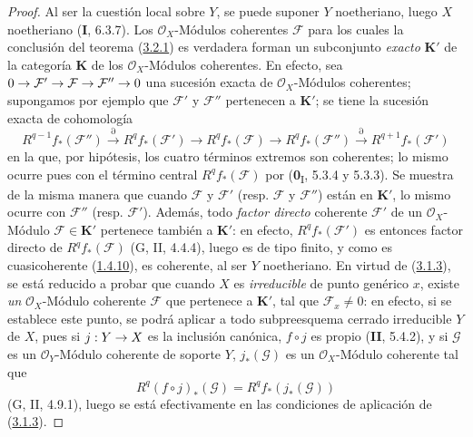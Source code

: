 \documentclass[10pt,oneside,openany]{book}
\theoremstyle{egaenv}\newtheorem*{env}{---}
\theoremstyle{egastatement}
\theoremstyle{egadescription}
\newcommand{\oldpage}[2][]{\marginnote{\normalfont\scriptsize\textbf{#1}\,|\,#2}\ignorespaces}
\renewcommand{\to}{\mathchoice{\longrightarrow}{\rightarrow}{\rightarrow}{\rightarrow}}
\begin{document}
\begin{proof}
Al ser la cuestión local sobre $Y$, se puede suponer $Y$ noetheriano, luego $X$
noetheriano (\textbf{I}, 6.3.7). Los $\mathcal O_X$-Módulos coherentes $\mathcal F$ para
los cuales la conclusión del teorema (\hyperref[III.3.2.1-fr]{3.2.1}) es verdadera
forman un subconjunto \emph{exacto} $\boldsymbol{K}'$ de la categoría $\boldsymbol{K}$ de los
$\mathcal O_X$-Módulos coherentes.
\oldpage[III]{117}
En efecto, sea
$0\to\mathcal F'\to\mathcal F\to\mathcal F''\to0$ una sucesión exacta de
$\mathcal O_X$-Módulos coherentes; supongamos por ejemplo que $\mathcal F'$
y $\mathcal F''$ pertenecen a $\boldsymbol{K}'$; se tiene la sucesión exacta de cohomología
\[
R^{q-1}f_*(\mathcal F'')\xrightarrow{\partial}R^qf_*(\mathcal F')
\longrightarrow R^qf_*(\mathcal F)\longrightarrow R^qf_*(\mathcal F'')
\xrightarrow{\partial}R^{q+1}f_*(\mathcal F')
\]
en la que, por hipótesis, los cuatro términos extremos son coherentes;
lo mismo ocurre pues con el término central $R^qf_*(\mathcal F)$ por
(\textbf{0}\textsubscript{I}, 5.3.4 y 5.3.3). Se muestra de la misma manera que
cuando $\mathcal F$ y $\mathcal F'$ (resp. $\mathcal F$ y
$\mathcal F''$) están en $\boldsymbol{K}'$, lo mismo ocurre con $\mathcal F''$ (resp.
$\mathcal F'$). Además, todo \emph{factor directo} coherente $\mathcal F'$
de un $\mathcal O_X$-Módulo $\mathcal F\in\boldsymbol{K}'$ pertenece también a $\boldsymbol{K}'$: en
efecto, $R^qf_*(\mathcal F')$ es entonces factor directo de
$R^qf_*(\mathcal F)$ (G, II, 4.4.4), luego es de tipo finito, y como es
cuasicoherente (\hyperref[III.1.4.10-fr]{1.4.10}), es coherente, al ser $Y$
noetheriano. En virtud de (\hyperref[III.3.1.3-fr]{3.1.3}), se está
reducido a probar que cuando $X$ es \emph{irreducible} de punto genérico
$x$, existe \emph{un} $\mathcal O_X$-Módulo coherente $\mathcal F$ que pertenece a
$\boldsymbol{K}'$, tal que $\mathcal F_x\neq0$: en efecto, si se establece este punto, se
podrá aplicar a todo subpreesquema cerrado irreducible $Y$ de $X$, pues
si $j:Y\to X$ es la inclusión canónica, $f\circ j$ es propio (\textbf{II}, 5.4.2),
y si $\mathcal G$ es un $\mathcal O_Y$-Módulo coherente de soporte $Y$,
$j_*(\mathcal G)$ es un $\mathcal O_X$-Módulo coherente tal que
\[
R^q(f\circ j)_*(\mathcal G)=R^qf_*(j_*(\mathcal G))
\]
(G, II, 4.9.1), luego se está efectivamente en las condiciones de aplicación de
(\hyperref[III.3.1.3-fr]{3.1.3}).


\end{proof}
\end{document}
